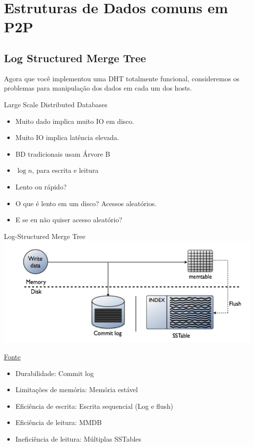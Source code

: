 
\section[ED para SD]{Estruturas de Dados comuns em P2P}
\subsection{Log Structured Merge Tree}

Agora que você implementou uma DHT totalmente funcional, consideremos os problemas para manipulação dos dados em cada um dos hosts.

\begin{frame}{Large Scale Distributed Databases}
\begin{itemize}
\item Muito dado implica muito IO em disco.
\item Muito IO implica latência elevada.
\pause
\item BD tradicionais usam Árvore B
\item $\log{n}$, para escrita e leitura
\item Lento ou rápido?
\pause 
\item O que é lento em um disco?\pause{} Acessos aleatórios.
\item E se eu não quiser acesso aleatório?
\end{itemize}
\end{frame}

\begin{frame}{Log-Structured Merge Tree}
\includegraphics[width=.7\textwidth]{./images/lsm2.png}

\href{https://docs.datastax.com/en/cassandra/3.0/cassandra/dml/dmlHowDataWritten.html}{Fonte}

\begin{itemize}
	\item Durabilidade: Commit log
	\item Limitações de memória: Memória estável
	\item Eficiência de escrita: Escrita sequencial (Log e flush)
	\item Eficiência de leitura: MMDB
	\item Ineficiência de leitura: Múltiplas SSTables
\end{itemize}
\end{frame}

